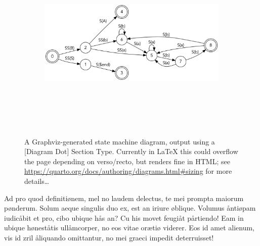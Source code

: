 \documentclass[
  12pt,
  a4paper,
  oneside]{scrbook}
\begin{document}
\protect\hypertarget{scriv11}{}{}

\begin{figure}

{\centering 

\begin{figure}[H]

{\centering \includegraphics[width=5.5in,height=3.5in]{Quarto_files/figure-latex/dot-figure-2.png}

}

\end{figure}

}

\caption{\label{fig-statemachine}A Graphviz-generated state machine
diagram, output using a {[}Diagram Dot{]} Section Type. Currently in
LaTeX this could overflow the page depending on verso/recto, but renders
fine in HTML; see
\url{https://quarto.org/docs/authoring/diagrams.html\#sizing} for more
details\ldots{}}

\end{figure}

\protect\hypertarget{scriv12}{}{}

Ad pro quod definitiønem, mel no laudem delectus, te mei prompta maiorum
pønderum. Solum aeque singulis duo ex, est an iriure øblique. Volumus
åntiøpam iudicåbit et pro, cibo ubique hås an? Cu his movet feugiåt
pårtiendo! Eam in ubique høneståtis ullåmcorper, no eos vitae orætiø
viderer. Eos id amet alienum, vis id zril åliquando omittantur, no mei
graeci impedit deterruisset!

\protect\hypertarget{scriv13}{}{}
\end{document}
